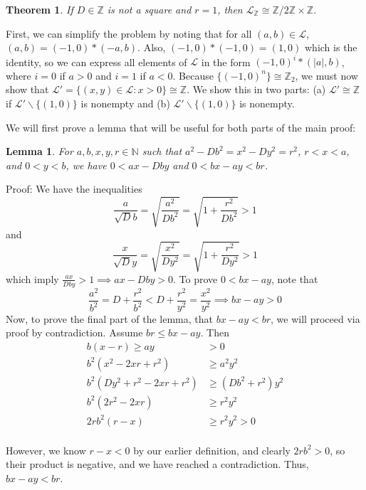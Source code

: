 \documentclass{article}
\newtheorem{theorem}{Theorem}
\newtheorem{lemma}{Lemma}
\begin{document}
\begin{theorem}
	If $D \in \mathbb{Z}$ is not a square and $r=1$, then $\mathcal{L}_{\mathbb{Z}} \cong \mathbb{Z} / 2\mathbb{Z} \times \mathbb{Z}$.
\end{theorem}

First, we can simplify the problem by noting that for all $(a,b) \in \mathcal{L}$, $(a,b) = (-1,0)*(-a,b)$. Also, $(-1,0)*(-1,0)=(1,0)$ which is the identity, so we can express all elements of $\mathcal{L}$ in the form $(-1,0)^i*(\lvert a\rvert, b)$, where $i=0$ if $a>0$ and $i=1$ if $a<0$. Because $\{(-1,0)^n\} \cong \mathbb{Z}_2$, we must now show that $\mathcal{L}'=\{(x,y) \in \mathcal{L} : x > 0\} \cong \mathbb{Z}$. We show this in two parts: (a) $\mathcal{L}' \cong \mathbb{Z}$ if $\mathcal{L}'\backslash \{(1,0)\}$ is nonempty and (b) $\mathcal{L}' \backslash \{(1,0)\}$ is nonempty.

We will first prove a lemma that will be useful for both parts of the main proof:

\begin{lemma}
    For $a,b,x,y,r \in \mathbb{N}$ such that $a^2-Db^2 = x^2-Dy^2=r^2$, $r<x<a$, and $0<y<b$, we have $0 < ax - Dby$ and $0 < bx - ay < br$.
\end{lemma}

Proof: We have the inequalities $$\frac{a}{\sqrt{D}b} = \sqrt{\frac{a^2}{Db^2}} = \sqrt{1 + \frac{r^2}{Db^2}} > 1$$ and $$\frac{x}{\sqrt{D}y} = \sqrt{\frac{x^2}{Dy^2}} = \sqrt{1+\frac{r^2}{Dy^2}} > 1$$ which imply $\frac{ax}{Dby} > 1 \implies ax - Dby > 0$. To prove $0 < bx - ay$, note that $$\frac{a^2}{b^2} = D + \frac{r^2}{b^2} < D + \frac{r^2}{y^2} = \frac{x^2}{y^2} \implies bx - ay > 0$$ Now, to prove the final part of the lemma, that $bx - ay < br$, we will proceed via proof by contradiction. Assume $br \leq bx - ay$. Then
\begin{align*}
    b(x-r) \geq ay &> 0 \\
    b^2(x^2-2xr+r^2) &\geq a^2y^2 \\
    b^2(Dy^2+r^2-2xr+r^2) &\geq (Db^2+r^2)y^2 \\
    b^2(2r^2-2xr) &\geq r^2y^2 \\
    2rb^2(r-x) &\geq r^2y^2 > 0 \\
\end{align*}

However, we know $r-x < 0$ by our earlier definition, and clearly $2rb^2 > 0$, so their product is negative, and we have reached a contradiction. Thus, $bx - ay < br$.
\end{document}
